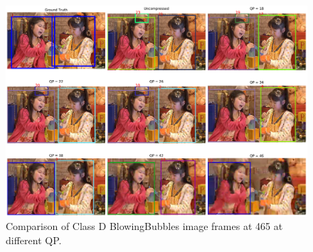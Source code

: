 \begin{figure}[!htbp]
  \centering
  \includegraphics[width=1.0\linewidth]{img/BlowingBubbles_0_frame465.pdf}
  \caption[Comparison of Class D BlowingBubbles image frames at 465 at different QP]
  {
  Comparison of Class D BlowingBubbles image frames at 465 at different QP.
  }
  \label{fig:BlowingBubbles_0_frame465}
\end{figure}